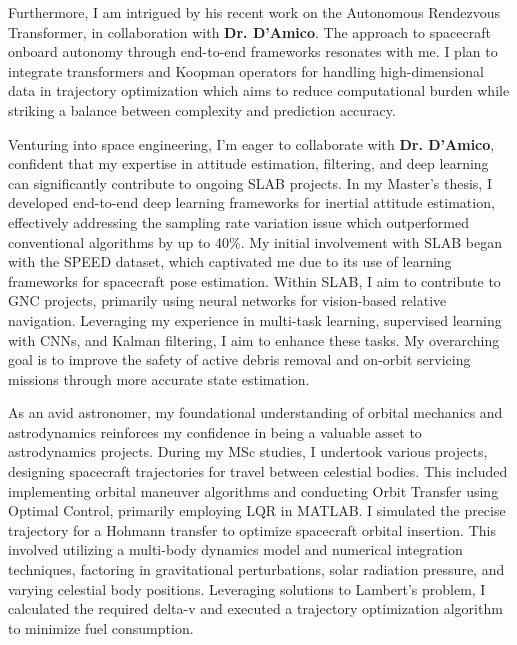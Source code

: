 \documentclass[a4,20pt]{article}
\begin{document}
\begin{large}
Furthermore, I am intrigued by his recent work on the Autonomous Rendezvous Transformer, in collaboration with \textbf{Dr. D'Amico}. The approach to spacecraft onboard autonomy through end-to-end frameworks resonates with me. I plan to integrate transformers and Koopman operators for handling high-dimensional data in trajectory optimization which aims to reduce computational burden while striking a balance between complexity and prediction accuracy.


Venturing into space engineering, I'm eager to collaborate with \textbf{Dr. D'Amico}, confident that my expertise in attitude estimation, filtering, and deep learning can significantly contribute to ongoing SLAB projects. In my Master’s thesis, I developed end-to-end deep learning frameworks for inertial attitude estimation, effectively addressing the sampling rate variation issue which outperformed conventional algorithms by up to 40\%. My initial involvement with SLAB began with the SPEED dataset, which captivated me due to its use of learning frameworks for spacecraft pose estimation. Within SLAB, I aim to contribute to GNC projects, primarily using neural networks for vision-based relative navigation. Leveraging my experience in multi-task learning, supervised learning with CNNs, and Kalman filtering, I aim to enhance these tasks. My overarching goal is to improve the safety of active debris removal and on-orbit servicing missions through more accurate state estimation.

As an avid astronomer, my foundational understanding of orbital mechanics and astrodynamics reinforces my confidence in being a valuable asset to astrodynamics projects. During my MSc studies, I undertook various projects, designing spacecraft trajectories for travel between celestial bodies. This included implementing orbital maneuver algorithms and conducting Orbit Transfer using Optimal Control, primarily employing LQR in MATLAB. I simulated the precise trajectory for a Hohmann transfer to optimize spacecraft orbital insertion. This involved utilizing a multi-body dynamics model and numerical integration techniques, factoring in gravitational perturbations, solar radiation pressure, and varying celestial body positions. Leveraging solutions to Lambert's problem, I calculated the required delta-v and executed a trajectory optimization algorithm to minimize fuel consumption.



\end{large}
\end{document}
